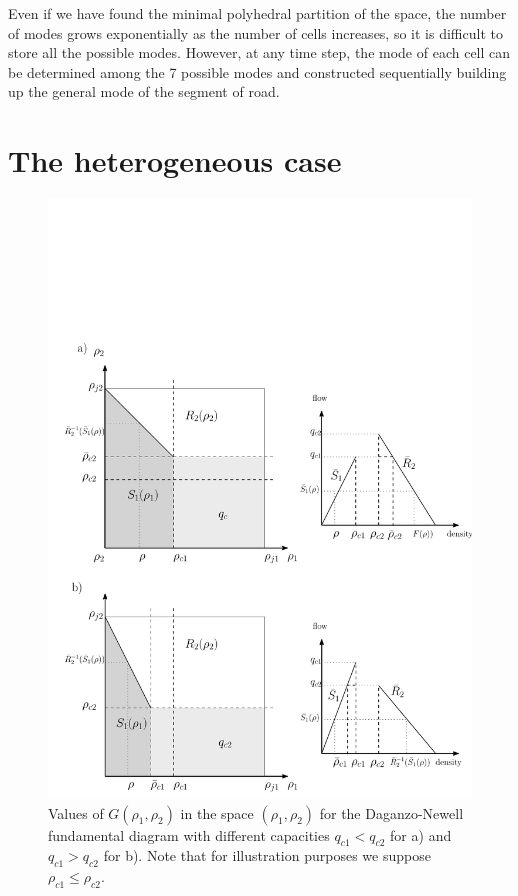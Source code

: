Even if we have found the minimal polyhedral partition of the space, the number of modes grows exponentially as the number of cells increases, so it is difficult to store all the possible modes. However, at any time step, the mode of each cell can be determined among the 7 possible modes and constructed sequentially building up the general mode of the segment of road.


\section{The heterogeneous case}\label{sec:CDFD}

\begin{figure}[ht]
  \centering
    \includegraphics[width=12cm]{godunovDiagram3.pdf}
    \caption{Values of $G(\rho_{1},\rho_{2})$ in the space $(\rho_{1},\rho_{2})$ for the Daganzo-Newell fundamental diagram with different capacities $q_{c1} < q_{c2}$ for a) and $q_{c1} > q_{c2}$ for b). Note that for illustration purposes we suppose $\rho_{c1}\leq\rho_{c2}$.}
    \label{fig:godunovDiagram3}
\end{figure}

